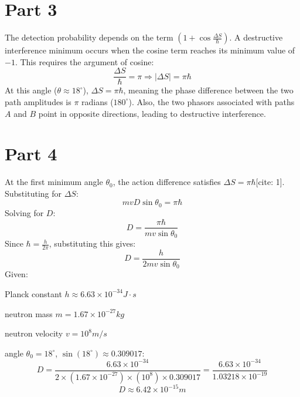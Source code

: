 \documentclass{article}
\begin{document}
\section {Part 3}

The detection probability depends on the term $(1 + \cos \frac{\Delta S}{\hbar})$. A destructive interference minimum occurs when the cosine term reaches its minimum value of $-1$. This requires the argument of cosine:
    \[
    \frac{\Delta S}{\hbar} = \pi \Rightarrow |\Delta S| = \pi\hbar
    \]
At this angle ($\theta \approx 18^\circ$), $\Delta S = \pi\hbar$, meaning the phase difference between the two path amplitudes is $\pi$ radians ($180^\circ$). Also, the two phasors associated with paths $A$ and $B$ point in opposite directions, leading to destructive interference. 

\section {Part 4}

At the first minimum angle $\theta_0$, the action difference satisfies $\Delta S = \pi\hbar$[cite: 1]. Substituting for $\Delta S$:
    \[
    m v D \sin\theta_0 = \pi\hbar
    \]
    Solving for $D$:
    \[
    D = \frac{\pi\hbar}{m v \sin\theta_0}
    \]
    Since $\hbar = \frac{h}{2\pi}$, substituting this gives:
    \[
    D = \frac{h}{2 m v \sin\theta_0}
    \]
Given:

Planck constant $h \approx 6.63 \times 10^{-34} J\cdot{s}$

neutron mass $m = 1.67 \times 10^{-27} { kg}$

neutron velocity $v = 10^8 { m/s}$

angle $\theta_0 = 18^\circ$, $\sin(18^\circ) \approx 0.309017$:
    \[
    D = \frac{6.63 \times 10^{-34}}{2 \times (1.67 \times 10^{-27}) \times (10^8) \times 0.309017} = \frac{6.63 \times 10^{-34}}{1.03218 \times 10^{-19}}
    \]
    \[
    D \approx 6.42 \times 10^{-15} { m}
    \]
\end{document}
